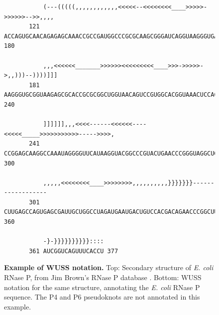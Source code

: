 \begin{figure}[tp]
\begin{center}
{\begin{BVerbatim}
           (---(((((,,,,,,,,,,,,<<<<<--<<<<<<<<____>>>>>->>>>>>-->>,,,,
       121 ACCAGUGCAACAGAGAGCAAACCGCCGAUGGCCCGCGCAAGCGGGAUCAGGUAAGGGUGA 180     

           ,,,<<<<<<_______>>>>>><<<<<<<<<____>>>->>>>>->,,)))--))))]]]
       181 AAGGGUGCGGUAAGAGCGCACCGCGCGGCUGGUAACAGUCCGUGGCACGGUAAACUCCAC 240     

           ]]]]]],,,<<<<------<<<<<<----<<<<<_____>>>>>>>>>>>----->>>>,
       241 CCGGAGCAAGGCCAAAUAGGGGUUCAUAAGGUACGGCCCGUACUGAACCCGGGUAGGCUG 300     

           ,,,,,<<<<<<<<____>>>>>>>>,,,,,,,,,,}}}}}}}------------------
       301 CUUGAGCCAGUGAGCGAUUGCUGGCCUAGAUGAAUGACUGUCCACGACAGAACCCGGCUU 360     

           -}-}}}}}}}}}}::::
       361 AUCGGUCAGUUUCACCU 377     
\end{BVerbatim} 
}
\end{center}
\caption{\small \textbf{Example of WUSS notation.} Top: Secondary
structure of \emph{E. coli} RNase P, from Jim Brown's RNase P database
\cite{Brown99}. Bottom: WUSS notation for the same structure,
annotating the \emph{E. coli} RNase P sequence. The P4 and P6
pseudoknots are not annotated in this example.}
\label{fig:RNaseP}
\end{figure}

